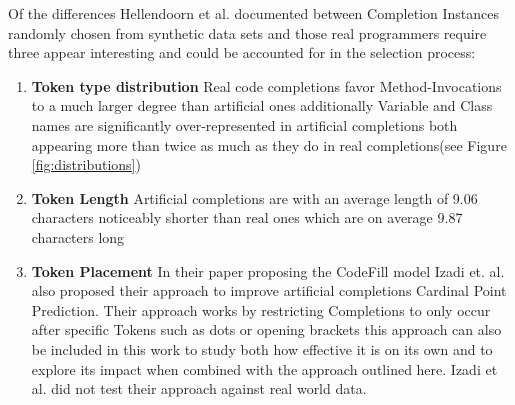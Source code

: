 \documentclass[sigplan,screen,9pt]{acmart}
\begin{document}





Of the differences Hellendoorn et al. documented between Completion Instances randomly chosen from synthetic data sets and those real programmers require three appear interesting and could be accounted for in the selection process:
\begin{enumerate}
    \item {\bf Token type distribution}
     Real code completions favor Method-Invocations to a much larger degree than artificial ones additionally Variable and Class names are significantly over-represented in artificial completions both appearing more than twice as much as they do in real completions(see Figure \ref{fig:distributions})
    \item {\bf Token Length}
    Artificial completions are with an average length of 9.06 characters noticeably shorter than real ones which are on average 9.87 characters long
    \item {\bf Token Placement}
    In their paper proposing the CodeFill model Izadi et. al. \cite{Izadi_2022} also proposed their approach to improve artificial completions Cardinal Point Prediction.
    Their approach works by restricting Completions to only occur after specific Tokens such as dots or opening brackets this approach can also be included in this work to study both how effective it is on its own and to explore its impact when combined with the approach outlined here.
    Izadi et al. did not test their approach against real world data.    
\end{enumerate}
\end{document}
